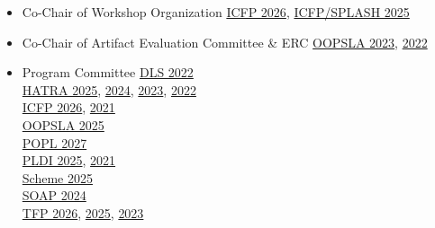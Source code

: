 \documentclass[11pt]{article}
\begin{document}
\begin{itemize}
  \item {Co-Chair of Workshop Organization} \hfill \href{https://icfp26.sigplan.org/committee/icfp-2026-organising-committee}{ICFP 2026}, \href{https://conf.researchr.org/committee/icfp-splash-2025/icfp-splash-2025-organizing-committee}{ICFP/SPLASH 2025}
  \item {Co-Chair of Artifact Evaluation Committee \& ERC} \hfill \href{https://2023.splashcon.org}{OOPSLA 2023}, \href{https://2022.splashcon.org}{2022}
  \item {Program Committee}
          \hfill \href{https://2022.splashcon.org/track/dls-2022-papers}{DLS 2022} \\
    \hbox{}\hfill \href{https://conf.researchr.org/home/icfp-splash-2025/hatra-2025}{HATRA 2025}, \href{https://2024.splashcon.org/home/hatra-2024}{2024}, \href{https://2023.splashcon.org/home/hatra-2023}{2023}, \href{https://2022.splashcon.org/home/hatra-2022}{2022} \\
   \hbox{}\hfill \href{https://icfp26.sigplan.org/committee/icfp-2026-icfp-papers-program-committee}{ICFP 2026}, \href{https://icfp21.sigplan.org/committee/icfp-2021-papers-program-committee}{2021} \\
   \hbox{}\hfill \href{https://2025.splashcon.org/committee/splash-2025-OOPSLA-oopsla-review-committee}{OOPSLA 2025} \\
   \hbox{}\hfill \href{https://popl27.sigplan.org/committee/POPL-2027-popl-research-papers-program-committee}{POPL 2027} \\
   \hbox{}\hfill \href{https://pldi25.sigplan.org/committee/pldi-2025-papers-pldi-review-committee}{PLDI 2025}, \href{https://pldi21.sigplan.org/committee/pldi-2021-papers-program-committee}{2021} \\
   \hbox{}\hfill \href{https://conf.researchr.org/home/icfp-splash-2025/scheme-2025}{Scheme 2025} \\
   \hbox{}\hfill \href{https://pldi24.sigplan.org/home/SOAP-2024}{SOAP 2024} \\
   \hbox{}\hfill \href{https://trendsfp.github.io/}{TFP 2026}, \href{https://trendsfp.github.io/2025/}{2025}, \href{https://trendsfp.github.io/2023/}{2023}


\end{itemize}
\end{document}
